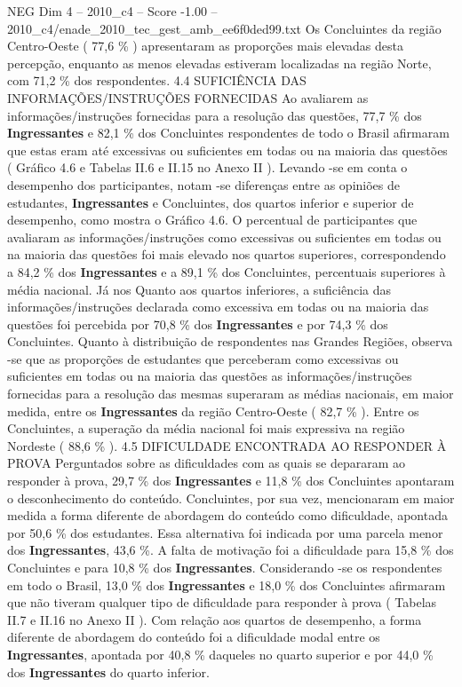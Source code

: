 \begin{textsample}{NEG Dim 4 – 2010\_c4 – Score -1.00 – 2010\_c4/enade\_2010\_tec\_gest\_amb\_ee6f0ded99.txt}
Os Concluintes da região Centro-Oeste ( 77,6 \% ) apresentaram as proporções mais elevadas desta percepção, enquanto as menos elevadas estiveram localizadas na região Norte, com 71,2 \% dos respondentes. 4.4 SUFICIÊNCIA DAS INFORMAÇÕES/INSTRUÇÕES FORNECIDAS Ao avaliarem as informações/instruções fornecidas para a resolução das questões, 77,7 \% dos \textbf{Ingressantes} e 82,1 \% dos Concluintes respondentes de todo o Brasil afirmaram que estas eram até excessivas ou suficientes em todas ou na maioria das questões ( Gráfico 4.6 e Tabelas II.6 e II.15 no Anexo II ).
Levando -se em conta o desempenho dos participantes, notam -se diferenças entre as opiniões de estudantes, \textbf{Ingressantes} e Concluintes, dos quartos inferior e superior de desempenho, como mostra o Gráfico 4.6.
O percentual de participantes que avaliaram as informações/instruções como excessivas ou suficientes em todas ou na maioria das questões foi mais elevado nos quartos superiores, correspondendo a 84,2 \% dos \textbf{Ingressantes} e a 89,1 \% dos Concluintes, percentuais superiores à média nacional.
Já nos Quanto aos quartos inferiores, a suficiência das informações/instruções declarada como excessiva em todas ou na maioria das questões foi percebida por 70,8 \% dos \textbf{Ingressantes} e por 74,3 \% dos Concluintes.
Quanto à distribuição de respondentes nas Grandes Regiões, observa -se que as proporções de estudantes que perceberam como excessivas ou suficientes em todas ou na maioria das questões as informações/instruções fornecidas para a resolução das mesmas superaram as médias nacionais, em maior medida, entre os \textbf{Ingressantes} da região Centro-Oeste ( 82,7 \% ).
Entre os Concluintes, a superação da média nacional foi mais expressiva na região Nordeste ( 88,6 \% ). 4.5 DIFICULDADE ENCONTRADA AO RESPONDER À PROVA Perguntados sobre as dificuldades com as quais se depararam ao responder à prova, 29,7 \% dos \textbf{Ingressantes} e 11,8 \% dos Concluintes apontaram o desconhecimento do conteúdo.
Concluintes, por sua vez, mencionaram em maior medida a forma diferente de abordagem do conteúdo como dificuldade, apontada por 50,6 \% dos estudantes.
Essa alternativa foi indicada por uma parcela menor dos \textbf{Ingressantes}, 43,6 \%.
A falta de motivação foi a dificuldade para 15,8 \% dos Concluintes e para 10,8 \% dos \textbf{Ingressantes}.
Considerando -se os respondentes em todo o Brasil, 13,0 \% dos \textbf{Ingressantes} e 18,0 \% dos Concluintes afirmaram que não tiveram qualquer tipo de dificuldade para responder à prova ( Tabelas II.7 e II.16 no Anexo II ).
Com relação aos quartos de desempenho, a forma diferente de abordagem do conteúdo foi a dificuldade modal entre os \textbf{Ingressantes}, apontada por 40,8 \% daqueles no quarto superior e por 44,0 \% dos \textbf{Ingressantes} do quarto inferior.

\end{textsample}
